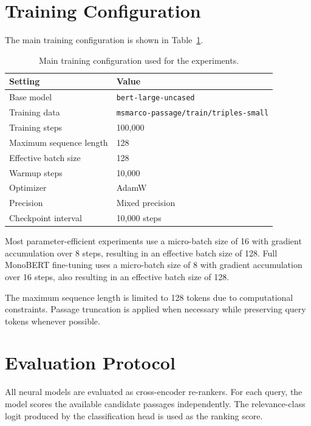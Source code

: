 \section{Training Configuration}
\label{sec:methodology_training_configuration}

The main training configuration is shown in Table~\ref{tab:methodology_training_config}.

\begin{table}[ht]
\centering
\begin{tabular}{ll}
\hline
\textbf{Setting} & \textbf{Value} \\
\hline
Base model & \texttt{bert-large-uncased} \\
Training data & \texttt{msmarco-passage/train/triples-small} \\
Training steps & 100,000 \\
Maximum sequence length & 128 \\
Effective batch size & 128 \\
Warmup steps & 10,000 \\
Optimizer & AdamW \\
Precision & Mixed precision \\
Checkpoint interval & 10,000 steps \\
\hline
\end{tabular}
\caption{Main training configuration used for the experiments.}
\label{tab:methodology_training_config}
\end{table}

Most parameter-efficient experiments use a micro-batch size of 16 with gradient accumulation over 8 steps, resulting in an effective batch size of 128. Full MonoBERT fine-tuning uses a micro-batch size of 8 with gradient accumulation over 16 steps, also resulting in an effective batch size of 128.

The maximum sequence length is limited to 128 tokens due to computational constraints. Passage truncation is applied when necessary while preserving query tokens whenever possible.

\section{Evaluation Protocol}
\label{sec:methodology_evaluation_protocol}

All neural models are evaluated as cross-encoder re-rankers. For each query, the model scores the available candidate passages independently. The relevance-class logit produced by the classification head is used as the ranking score.

